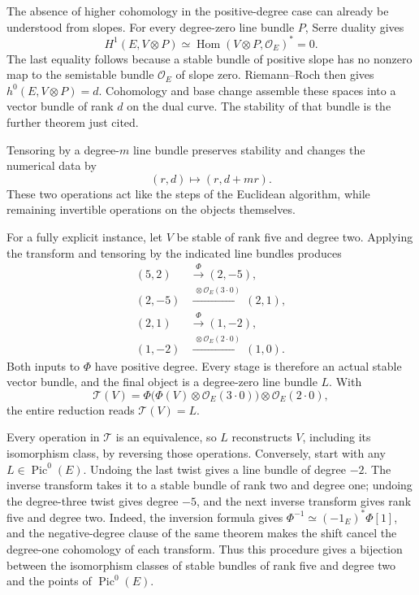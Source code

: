 \documentclass[11pt]{article}
\theoremstyle{remark}
\begin{document}
The absence of higher cohomology in the positive-degree case can already be understood from slopes. For every degree-zero line bundle \(P\), Serre duality gives
\[
H^1(E,V\otimes P)\simeq
\operatorname{Hom}(V\otimes P,\mathcal O_E)^*=0.
\]
The last equality follows because a stable bundle of positive slope has no nonzero map to the semistable bundle \(\mathcal O_E\) of slope zero. Riemann--Roch then gives \(h^0(E,V\otimes P)=d\). Cohomology and base change assemble these spaces into a vector bundle of rank \(d\) on the dual curve. The stability of that bundle is the further theorem just cited.

Tensoring by a degree-\(m\) line bundle preserves stability and changes the numerical data by
\[
(r,d)\longmapsto(r,d+mr).
\]
These two operations act like the steps of the Euclidean algorithm, while remaining invertible operations on the objects themselves.

For a fully explicit instance, let \(V\) be stable of rank five and degree two. Applying the transform and tensoring by the indicated line bundles produces
\begin{align*}
(5,2)&\xrightarrow{\ \Phi\ }(2,-5),\\
(2,-5)&\xrightarrow{\ \otimes\mathcal O_E(3\cdot0)\ }(2,1),\\
(2,1)&\xrightarrow{\ \Phi\ }(1,-2),\\
(1,-2)&\xrightarrow{\ \otimes\mathcal O_E(2\cdot0)\ }(1,0).
\end{align*}
Both inputs to \(\Phi\) have positive degree. Every stage is therefore an actual stable vector bundle, and the final object is a degree-zero line bundle \(L\). With
\[
\mathcal T(V)
=\Phi\bigl(\Phi(V)\otimes\mathcal O_E(3\cdot0)\bigr)
\otimes\mathcal O_E(2\cdot0),
\]
the entire reduction reads \(\mathcal T(V)=L\).

Every operation in \(\mathcal T\) is an equivalence, so \(L\) reconstructs \(V\), including its isomorphism class, by reversing those operations. Conversely, start with any \(L\in\operatorname{Pic}^0(E)\). Undoing the last twist gives a line bundle of degree \(-2\). The inverse transform takes it to a stable bundle of rank two and degree one; undoing the degree-three twist gives degree \(-5\), and the next inverse transform gives rank five and degree two. Indeed, the inversion formula gives \(\Phi^{-1}\simeq(-1_E)^*\Phi[1]\), and the negative-degree clause of the same theorem makes the shift cancel the degree-one cohomology of each transform. Thus this procedure gives a bijection between the isomorphism classes of stable bundles of rank five and degree two and the points of \(\operatorname{Pic}^0(E)\).
\end{document}
